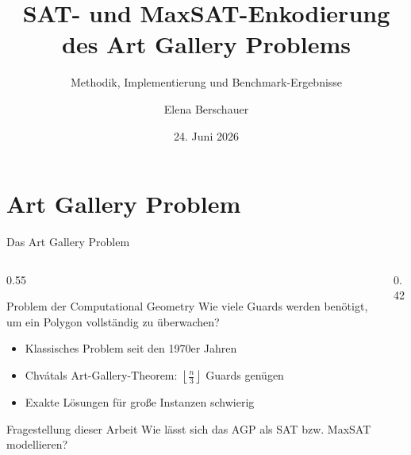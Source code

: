 \documentclass[11pt,aspectratio=169]{beamer}
\title{SAT- und MaxSAT-Enkodierung des Art Gallery Problems}
\subtitle{Methodik, Implementierung und Benchmark-Ergebnisse}
\author{Elena Berschauer}
\institute{Lehrstuhl für Rechnerarchitektur \\
Betreuer: Mathias Fleury}
\date{24. Juni 2026}
\begin{document}
\begin{frame}
  \titlepage
\end{frame}


\section{Art Gallery Problem}
\begin{frame}{Das Art Gallery Problem}
  \begin{columns}[T]

    \begin{column}{0.55\textwidth}

      \begin{block}{Problem der Computational Geometry}
        \vspace{0.3em}
        Wie viele Guards werden benötigt,
        um ein Polygon vollständig zu überwachen?
      \end{block}

      \vspace{0.3em}

      \begin{itemize}
        \item Klassisches Problem seit den 1970er Jahren
        \item Chvátals Art-Gallery-Theorem:
              $\left\lfloor \frac{n}{3} \right\rfloor$ Guards genügen
        \item Exakte Lösungen für große Instanzen schwierig
      \end{itemize}

      \vspace{0.3em}

      \begin{alertblock}{Fragestellung dieser Arbeit}
        Wie lässt sich das AGP als SAT bzw. MaxSAT modellieren?
      \end{alertblock}

    \end{column}

    \begin{column}{0.42\textwidth}
      \centering

\end{column}
\end{columns}
\end{frame}
\end{document}

